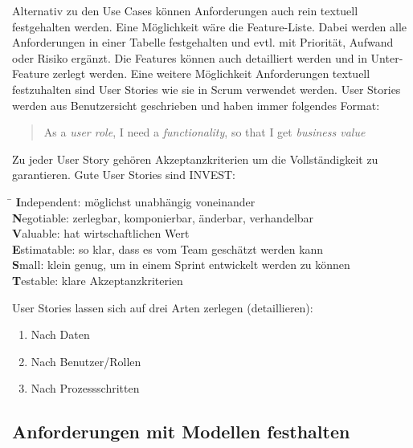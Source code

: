 Alternativ zu den Use Cases können Anforderungen auch rein textuell festgehalten werden. Eine Möglichkeit wäre die Feature-Liste. Dabei werden alle Anforderungen in einer Tabelle festgehalten und evtl. mit Priorität, Aufwand oder Risiko ergänzt. Die Features können auch detailliert werden und in Unter-Feature zerlegt werden. Eine weitere Möglichkeit Anforderungen textuell festzuhalten sind User Stories wie sie in Scrum verwendet werden. User Stories werden aus Benutzersicht geschrieben und haben immer folgendes Format:
\begin{quote}
	As a \emph{user role}, I need a \emph{functionality}, so that I get \emph{business value}
\end{quote}
Zu jeder User Story gehören Akzeptanzkriterien um die Vollständigkeit zu garantieren. Gute User Stories sind INVEST:
\begin{tabbing}
	\hspace{3cm}\=\kill
	\textbf{I}ndependent: \> möglichst unabhängig voneinander \\
	\textbf{N}egotiable: \> zerlegbar, komponierbar, änderbar, verhandelbar \\
	\textbf{V}aluable: \> hat wirtschaftlichen Wert \\
	\textbf{E}stimatable: \> so klar, dass es vom Team geschätzt werden kann \\
	\textbf{S}mall: \> klein genug, um in einem Sprint entwickelt werden zu können \\
	\textbf{T}estable: \> klare Akzeptanzkriterien 
\end{tabbing}
User Stories lassen sich auf drei Arten zerlegen (detaillieren):
\begin{enumerate}
	\item Nach Daten
	\item Nach Benutzer/Rollen
	\item Nach Prozessschritten
\end{enumerate}

\subsection{Anforderungen mit Modellen festhalten}

